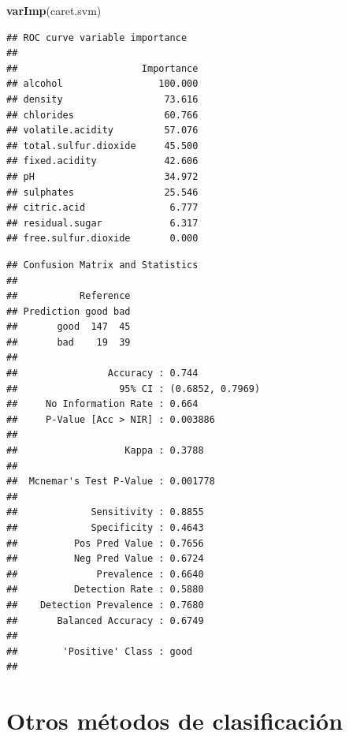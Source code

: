 \documentclass[
]{book}
\newenvironment{Shaded}{\begin{snugshade}}{\end{snugshade}}
\newcommand{\DataTypeTok}[1]{\textcolor[rgb]{0.13,0.29,0.53}{#1}}
\newcommand{\KeywordTok}[1]{\textcolor[rgb]{0.13,0.29,0.53}{\textbf{#1}}}
\newcommand{\NormalTok}[1]{#1}
\newcommand{\OperatorTok}[1]{\textcolor[rgb]{0.81,0.36,0.00}{\textbf{#1}}}
\theoremstyle{break}
\theoremstyle{definition}
\theoremstyle{definition}
\theoremstyle{definition}
\theoremstyle{remark}
\begin{document}
\begin{Shaded}
\begin{Highlighting}[]
\KeywordTok{varImp}\NormalTok{(caret.svm)}
\end{Highlighting}
\end{Shaded}

\begin{verbatim}
## ROC curve variable importance
## 
##                      Importance
## alcohol                 100.000
## density                  73.616
## chlorides                60.766
## volatile.acidity         57.076
## total.sulfur.dioxide     45.500
## fixed.acidity            42.606
## pH                       34.972
## sulphates                25.546
## citric.acid               6.777
## residual.sugar            6.317
## free.sulfur.dioxide       0.000
\end{verbatim}

\begin{Shaded}
\end{Shaded}

\begin{verbatim}
## Confusion Matrix and Statistics
## 
##           Reference
## Prediction good bad
##       good  147  45
##       bad    19  39
##                                           
##                Accuracy : 0.744           
##                  95% CI : (0.6852, 0.7969)
##     No Information Rate : 0.664           
##     P-Value [Acc > NIR] : 0.003886        
##                                           
##                   Kappa : 0.3788          
##                                           
##  Mcnemar's Test P-Value : 0.001778        
##                                           
##             Sensitivity : 0.8855          
##             Specificity : 0.4643          
##          Pos Pred Value : 0.7656          
##          Neg Pred Value : 0.6724          
##              Prevalence : 0.6640          
##          Detection Rate : 0.5880          
##    Detection Prevalence : 0.7680          
##       Balanced Accuracy : 0.6749          
##                                           
##        'Positive' Class : good            
## 
\end{verbatim}

\hypertarget{class-otros}{%
\chapter{Otros métodos de clasificación}\label{class-otros}}
\end{document}
